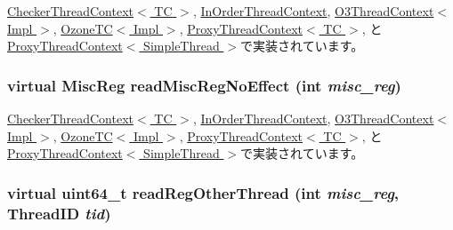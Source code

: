 \hyperlink{classCheckerThreadContext_a5a8c6c487e8da143d26188258b04f1cc}{CheckerThreadContext$<$ TC $>$}, \hyperlink{classInOrderThreadContext_a5a8c6c487e8da143d26188258b04f1cc}{InOrderThreadContext}, \hyperlink{classO3ThreadContext_a37c9d5a045a0d8da5db34db2dd663d40}{O3ThreadContext$<$ Impl $>$}, \hyperlink{classOzoneCPU_1_1OzoneTC_a34ce48319c94bd2802d790e830357b9c}{OzoneTC$<$ Impl $>$}, \hyperlink{classProxyThreadContext_a5a8c6c487e8da143d26188258b04f1cc}{ProxyThreadContext$<$ TC $>$}, と \hyperlink{classProxyThreadContext_a5a8c6c487e8da143d26188258b04f1cc}{ProxyThreadContext$<$ SimpleThread $>$}で実装されています。\hypertarget{classThreadContext_a93c9c97261cb7289d5976b8222f70c4c}{
\subsubsection[{readMiscRegNoEffect}]{\setlength{\rightskip}{0pt plus 5cm}virtual {\bf MiscReg} readMiscRegNoEffect (int {\em misc\_\-reg})}}
\label{classThreadContext_a93c9c97261cb7289d5976b8222f70c4c}


\hyperlink{classCheckerThreadContext_a7b5ac6af9c2c19d7c1b442b8a3aebbc6}{CheckerThreadContext$<$ TC $>$}, \hyperlink{classInOrderThreadContext_a7b5ac6af9c2c19d7c1b442b8a3aebbc6}{InOrderThreadContext}, \hyperlink{classO3ThreadContext_af74f978ea46123cf036c750e52d98438}{O3ThreadContext$<$ Impl $>$}, \hyperlink{classOzoneCPU_1_1OzoneTC_a1a9e07a956ef5a2611fe7cd590872097}{OzoneTC$<$ Impl $>$}, \hyperlink{classProxyThreadContext_a7b5ac6af9c2c19d7c1b442b8a3aebbc6}{ProxyThreadContext$<$ TC $>$}, と \hyperlink{classProxyThreadContext_a7b5ac6af9c2c19d7c1b442b8a3aebbc6}{ProxyThreadContext$<$ SimpleThread $>$}で実装されています。\hypertarget{classThreadContext_afcd73144c45c9fd2f36d55ea4c491505}{
\subsubsection[{readRegOtherThread}]{\setlength{\rightskip}{0pt plus 5cm}virtual uint64\_\-t readRegOtherThread (int {\em misc\_\-reg}, \/  {\bf ThreadID} {\em tid})}}
\label{classThreadContext_afcd73144c45c9fd2f36d55ea4c491505}


